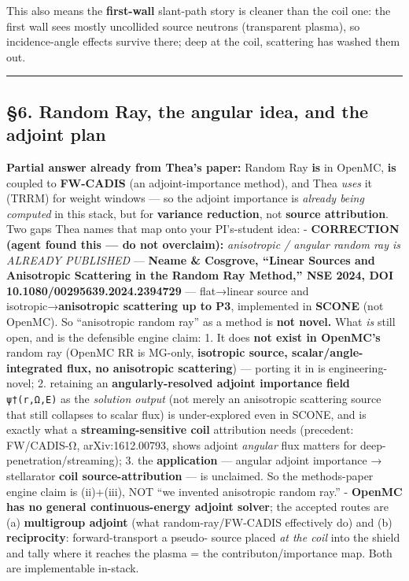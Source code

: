 \documentclass[
]{article}
\begin{document}
This also means the \textbf{first-wall} slant-path story is cleaner than
the coil one: the first wall sees mostly uncollided source neutrons
(transparent plasma), so incidence-angle effects survive there; deep at
the coil, scattering has washed them out.

\begin{center}\rule{0.5\linewidth}{0.5pt}\end{center}

\subsection{§6. Random Ray, the angular idea, and the adjoint
plan}\label{random-ray-the-angular-idea-and-the-adjoint-plan}

\textbf{Partial answer already from Thea's paper:} Random Ray
\textbf{is} in OpenMC, \textbf{is} coupled to \textbf{FW-CADIS} (an
adjoint-importance method), and Thea \emph{uses} it (TRRM) for weight
windows --- so the adjoint importance is \emph{already being computed}
in this stack, but for \textbf{variance reduction}, not \textbf{source
attribution}. Two gaps Thea names that map onto your PI's-student idea:
- \textbf{CORRECTION (agent found this --- do not overclaim):}
\emph{anisotropic / angular random ray is ALREADY PUBLISHED} ---
\textbf{Neame \& Cosgrove, ``Linear Sources and Anisotropic Scattering
in the Random Ray Method,'' NSE 2024, DOI 10.1080/00295639.2024.2394729}
--- flat→linear source and isotropic→\textbf{anisotropic scattering up
to P3}, implemented in \textbf{SCONE} (not OpenMC). So ``anisotropic
random ray'' as a method is \textbf{not novel.} What \emph{is} still
open, and is the defensible engine claim: 1. It does \textbf{not exist
in OpenMC's} random ray (OpenMC RR is MG-only, \textbf{isotropic source,
scalar/angle- integrated flux, no anisotropic scattering}) --- porting
it in is engineering-novel; 2. retaining an \textbf{angularly-resolved
adjoint importance field} \texttt{ψ†(r,Ω,E)} as the \emph{solution
output} (not merely an anisotropic scattering source that still
collapses to scalar flux) is under-explored even in SCONE, and is
exactly what a \textbf{streaming-sensitive coil} attribution needs
(precedent: FW/CADIS-Ω, arXiv:1612.00793, shows adjoint \emph{angular}
flux matters for deep-penetration/streaming); 3. the
\textbf{application} --- angular adjoint importance → stellarator
\textbf{coil source-attribution} --- is unclaimed. So the methods-paper
engine claim is (ii)+(iii), NOT ``we invented anisotropic random ray.''
- \textbf{OpenMC has no general continuous-energy adjoint solver}; the
accepted routes are (a) \textbf{multigroup adjoint} (what
random-ray/FW-CADIS effectively do) and (b) \textbf{reciprocity}:
forward-transport a pseudo- source placed \emph{at the coil} into the
shield and tally where it reaches the plasma = the
contributon/importance map. Both are implementable in-stack.
\end{document}
